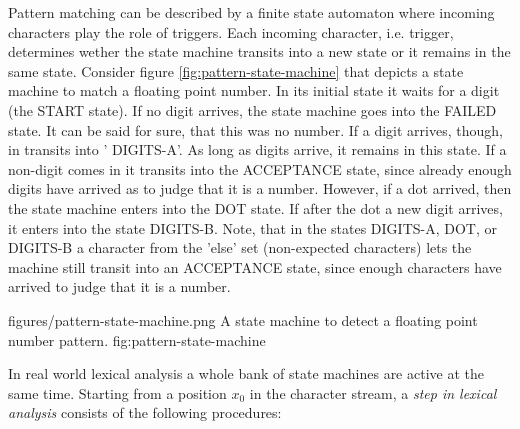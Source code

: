 Pattern matching can be described by a finite state automaton where
incoming characters play the role of triggers. Each incoming character, i.e.
trigger, determines wether the state machine transits into a new state or it
remains in the same state. Consider figure \ref{fig:pattern-state-machine}
that depicts a state machine to match a floating point number. In its initial
state it waits for a digit (the {\sf START} state). If no digit arrives, the
state machine goes into the {\sf FAILED} state. It can be said for sure, that
this was no number.  If a digit arrives, though, in transits into '{\sf
  DIGITS-A}'.  As long as digits arrive, it remains in this state. If a
non-digit comes in it transits into the {\sf ACCEPTANCE} state, since already
enough digits have arrived as to judge that it is a number. However, if a dot
arrived, then the state machine enters into the {\sf DOT} state. If after the
dot a new digit arrives, it enters into the state {\sf DIGITS-B}.  
Note, that in the states {\sf DIGITS-A}, {\sf DOT}, or {\sf DIGITS-B} a
character from the 'else' set (non-expected characters) lets the machine
still transit into an {\sf ACCEPTANCE} state, since enough characters have
arrived to judge that it is a number. 

\showpic
{figures/pattern-state-machine.png}
{A state machine to detect a floating point number pattern.}
{fig:pattern-state-machine}


In real world lexical analysis a whole bank of state machines are active at
the same time. Starting from a position $x_0$ in the character stream, a {\it
  step in lexical analysis} consists of the following procedures:

